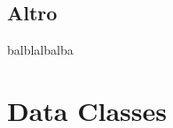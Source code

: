 \subsection{Altro}
balblalbalba



\section{Data Classes}



\clearpage{\pagestyle{empty}\cleardoublepage}
